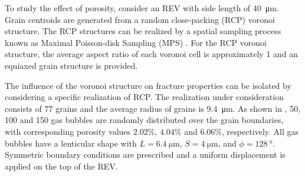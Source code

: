 To study the effect of porosity, consider an REV with side length of \SI{40}{\micro\meter}. Grain centroids are generated from a random close-packing (RCP) voronoi structure. The RCP structures can be realized by a spatial sampling process known as Maximal Poisson-disk Sampling (MPS) \cite{Ebeida2012}. For the RCP voronoi structure, the average aspect ratio of each voronoi cell is approximately 1 and an equiaxed grain structure is provided.

The influence of the voronoi structure on fracture properties can be isolated by considering a specific realization of RCP. The realization under consideration consists of 77 grains and the average radius of grains is \SI{9.4}{\micro\meter}. As shown in , 50, 100 and 150 gas bubbles are randomly distributed over the grain boundaries, with corresponding porosity values $2.02\%$, $4.04\%$ and $6.06\%$, respectively. All gas bubbles have a lenticular shape with $L = \SI{6.4}{\micro\meter}$, $S = \SI{4}{\micro\meter}$, and $\phi=\SI{128}{\degree}$. Symmetric boundary conditions are prescribed and a uniform displacement is applied on the top of the REV.

